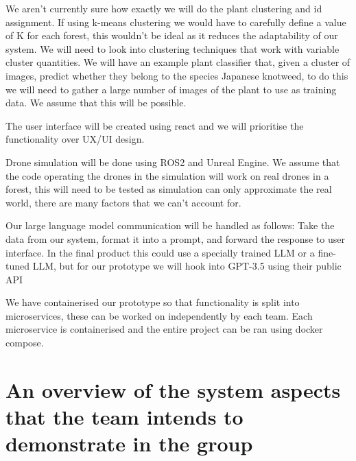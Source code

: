 \documentclass{article}
\begin{document}
We aren't currently sure how exactly we will do the plant clustering and id assignment.
If using k-means clustering we would have to carefully define a value of K for each forest, this wouldn't be ideal as it reduces the adaptability of our system.
We will need to look into clustering techniques that work with variable cluster quantities.
We will have an example plant classifier that, given a cluster of images, predict whether they belong to the species Japanese knotweed, to do this we will need to gather a large number of images of the plant to use as training data. 
We assume that this will be possible. %

The user interface will be created using react and we will prioritise the functionality over UX/UI design. 

Drone simulation will be done using ROS2 and Unreal Engine. %
We assume that the code operating the drones in the simulation will work on real drones in a forest, this will need to be tested as simulation can only approximate the real world, there are many factors that we can't account for.

Our large language model communication will be handled as follows: Take the data from our system, format it into a prompt, and forward the response to user interface.
In the final product this could use a specially trained LLM or a fine-tuned LLM, but for our prototype we will hook into GPT-3.5 using their public API %

We have containerised our prototype so that functionality is split into microservices, these can be worked on independently by each team.
Each microservice is containerised and the entire project can be ran using docker compose.


\section{An overview of the system aspects that the team intends to demonstrate in the group}
\end{document}
